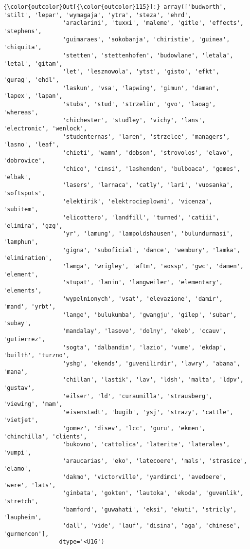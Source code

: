 \documentclass[11pt]{article}
\begin{document}
\begin{Verbatim}[commandchars=\\\{\}]
{\color{outcolor}Out[{\color{outcolor}115}]:} array(['budworth', 'stilt', 'lepar', 'wymagaja', 'ytra', 'steza', 'ehrd',
                 'araclarini', 'tuxxi', 'maleme', 'gitle', 'effects', 'stephens',
                 'guimaraes', 'sokobanja', 'chiristie', 'guinea', 'chiquita',
                 'stetten', 'stettenhofen', 'budowlane', 'letala', 'letal', 'gitam',
                 'let', 'lesznowola', 'ytst', 'gisto', 'efkt', 'gurag', 'ehdl',
                 'laskun', 'vsa', 'lapwing', 'gimun', 'daman', 'lapex', 'lapan',
                 'stubs', 'stud', 'strzelin', 'gvo', 'laoag', 'whereas',
                 'chichester', 'studley', 'vichy', 'lans', 'electronic', 'wenlock',
                 'studenternas', 'laren', 'strzelce', 'managers', 'lasno', 'leaf',
                 'chieti', 'wamm', 'dobson', 'strovolos', 'elavo', 'dobrovice',
                 'chico', 'cinsi', 'lashenden', 'bulboaca', 'gomes', 'elbak',
                 'lasers', 'larnaca', 'catly', 'lari', 'vuosanka', 'softspots',
                 'elektirik', 'elektrocieplowni', 'vicenza', 'subitem',
                 'elicottero', 'landfill', 'turned', 'catiii', 'elimina', 'gzg',
                 'yr', 'lamung', 'lampoldshausen', 'bulundurmasi', 'lamphun',
                 'gigna', 'suboficial', 'dance', 'wembury', 'lamka', 'elimination',
                 'lamga', 'wrigley', 'aftm', 'aossp', 'gwc', 'damen', 'element',
                 'stupat', 'lanin', 'langweiler', 'elementary', 'elements',
                 'wypelnionych', 'vsat', 'elevazione', 'damir', 'mand', 'yrbt',
                 'lange', 'bulukumba', 'gwangju', 'gilep', 'subar', 'subay',
                 'mandalay', 'lasovo', 'dolny', 'ekeb', 'ccauv', 'gutierrez',
                 'sogta', 'dalbandin', 'lazio', 'vume', 'ekdap', 'builth', 'turzno',
                 'yshg', 'ekends', 'guvenilirdir', 'lawry', 'abana', 'mana',
                 'chillan', 'lastik', 'lav', 'ldsh', 'malta', 'ldpv', 'gustav',
                 'eilser', 'ld', 'curaumilla', 'strausberg', 'viewing', 'mam',
                 'eisenstadt', 'bugib', 'ysj', 'strazy', 'cattle', 'vietjet',
                 'gomez', 'disev', 'lcc', 'guru', 'ekmen', 'chinchilla', 'clients',
                 'bukovno', 'cattolica', 'laterite', 'laterales', 'vumpi',
                 'araucarias', 'eko', 'latecoere', 'mals', 'strasice', 'elamo',
                 'dakmo', 'victorville', 'yardimci', 'avedoere', 'were', 'lats',
                 'ginbata', 'gokten', 'lautoka', 'ekoda', 'guvenlik', 'stretch',
                 'bamford', 'guwahati', 'eksi', 'ekuti', 'stricly', 'laupheim',
                 'dall', 'vide', 'lauf', 'disina', 'aga', 'chinese', 'gurmencon'],
                dtype='<U16')
\end{Verbatim}
            
\end{document}
